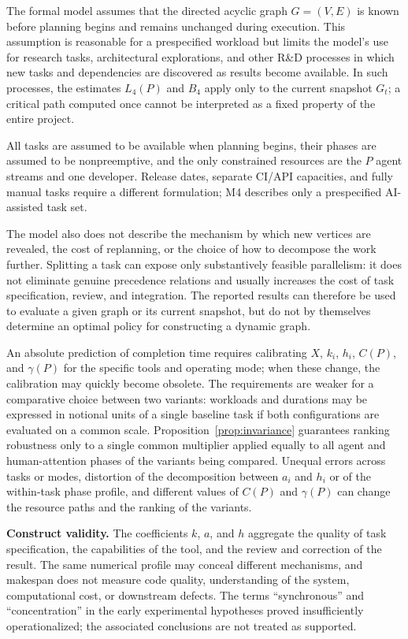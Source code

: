 The formal model assumes that the directed acyclic graph $G=(V,E)$ is known
before planning begins and remains unchanged during execution. This assumption
is reasonable for a prespecified workload but limits the model's use for
research tasks, architectural explorations, and other R\&D
processes in which new tasks and dependencies are discovered as results become
available. In such processes, the estimates $L_4(P)$ and $B_4$ apply only to the
current snapshot $G_t$; a critical path computed once cannot be interpreted as
a fixed property of the entire project.

All tasks are assumed to be available when planning begins, their phases are
assumed to be nonpreemptive, and the only constrained resources are the $P$
agent streams and one developer. Release dates, separate CI/API capacities, and
fully manual tasks require a different formulation; M4 describes only a
prespecified AI-assisted task set.

The model also does not describe the mechanism by which new vertices are
revealed, the cost of replanning, or the choice of how to decompose the work
further. Splitting a task can expose only substantively feasible parallelism: it
does not eliminate genuine precedence relations and usually increases the cost
of task specification, review, and integration. The reported results can
therefore be used to evaluate a given graph or its current snapshot, but do not
by themselves determine an optimal policy for constructing a dynamic graph.

An absolute prediction of completion time requires calibrating $X$, $k_i$,
$h_i$, $C(P)$, and $\gamma(P)$ for the specific tools and operating mode; when
these change, the calibration may quickly become obsolete. The requirements
are weaker for a comparative choice between two variants: workloads and
durations may be expressed in notional units of a single baseline task if both
configurations are evaluated on a common scale.
Proposition~\ref{prop:invariance} guarantees ranking robustness only to a single
common multiplier applied equally to all agent and human-attention phases of
the variants being compared. Unequal errors across tasks or modes, distortion
of the decomposition between $a_i$ and $h_i$ or of the within-task phase
profile, and different values of $C(P)$ and $\gamma(P)$ can change the resource
paths and the ranking of the variants.

\textbf{Construct validity.}
The coefficients $k$, $a$, and $h$ aggregate the quality of task specification,
the capabilities of the tool, and the review and correction of the result. The
same numerical profile may conceal different mechanisms, and makespan does not
measure code quality, understanding of the system, computational cost, or
downstream defects. The terms ``synchronous'' and ``concentration'' in the early
experimental hypotheses proved insufficiently operationalized; the associated
conclusions are not treated as supported.

